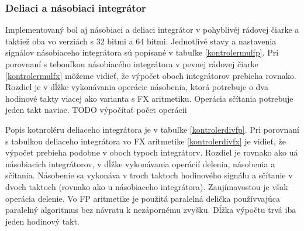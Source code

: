 \subsubsection*{Deliaci a násobiaci integrátor}
Implementovaný bol aj násobiaci a deliaci integrátor v pohyblivéj rádovej čiarke a taktiež oba vo verziách s 32 bitmi a 64 bitmi. Jednotlivé stavy a nastavenia signálov násobiaceho integrátora sú popísané v tabuľke \ref{kontrolermulfp}. Pri porovnaní s tebouľkou násobiacého integrátora v pevnej rádovej čiarke \ref{kontrolermulfx} môžeme vidieť, že výpočet oboch integrátorov prebieha rovnako. Rozdiel je v dĺžke vykonávania operácie násobenia, ktorá potrebuje o dva hodinové takty viacej ako varianta s FX aritmetiku. Operácia sčítania potrebuje jeden takt naviac. 
TODO výpočítať počet operácii

Popis kotnroléru deliaceho integrátora je v tabuľke \ref{kontrolerdivfp}. Pri porovnaní s tabulkou deliaceho integrátora vo FX aritmetike \ref{kontrolerdivfx} je vidieť, že výpočet prebieha podobne v oboch typoch integrátorv. Rozdiel je rovnako ako uá násobiacich integrátorov, v dĺžke vykonávania operácií delenia, násobenia a sčítania. Násobenie sa vykonáva v troch taktoch hodinového signálu a sčítanie v dvoch taktoch (rovnako ako u násobiaceho integrátora). Zaujímavostou je však operácia delenie. Vo FP aritmetike je použitá paralelná delička používvajúca paralelný algoritmus bez návratu k nezápornému zvyšku. Dĺžka výpočtu trvá iba jeden hodinový takt.






